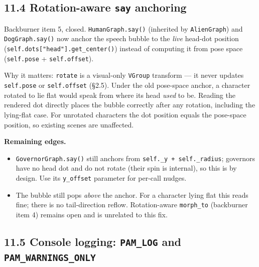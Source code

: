 \documentclass[
  11pt,
]{book}
\begin{document}
\subsection{\texorpdfstring{11.4 Rotation-aware \texttt{say}
anchoring}{11.4 Rotation-aware say anchoring}}\label{rotation-aware-say-anchoring}

Backburner item 5, closed. \texttt{HumanGraph.say()} (inherited by
\texttt{AlienGraph}) and \texttt{DogGraph.say()} now anchor the speech
bubble to the \emph{live} head-dot position
(\texttt{self.dots{[}"head"{]}.get\_center()}) instead of computing it
from pose space (\texttt{self.pose} + \texttt{self.offset}).

Why it matters: \texttt{rotate} is a visual-only \texttt{VGroup}
transform --- it never updates \texttt{self.pose} or
\texttt{self.offset} (§2.5). Under the old pose-space anchor, a
character rotated to lie flat would speak from where its head
\emph{used} to be. Reading the rendered dot directly places the bubble
correctly after any rotation, including the lying-flat case. For
unrotated characters the dot position equals the pose-space position,
so existing scenes are unaffected.

\textbf{Remaining edges.}

\begin{itemize}
\item
  \texttt{GovernorGraph.say()} still anchors from
  \texttt{self.\_y\ +\ self.\_radius}; governors have no head dot and
  do not rotate (their spin is internal), so this is by design. Use
  its \texttt{y\_offset} parameter for per-call nudges.
\item
  The bubble still pops \emph{above} the anchor. For a character lying
  flat this reads fine; there is no tail-direction reflow. Rotation-aware
  \texttt{morph\_to} (backburner item 4) remains open and is unrelated
  to this fix.
\end{itemize}

\subsection{\texorpdfstring{11.5 Console logging:
\texttt{PAM\_LOG} and
\texttt{PAM\_WARNINGS\_ONLY}}{11.5 Console logging: PAM\_LOG and PAM\_WARNINGS\_ONLY}}\label{console-logging-pam-log}
\end{document}
